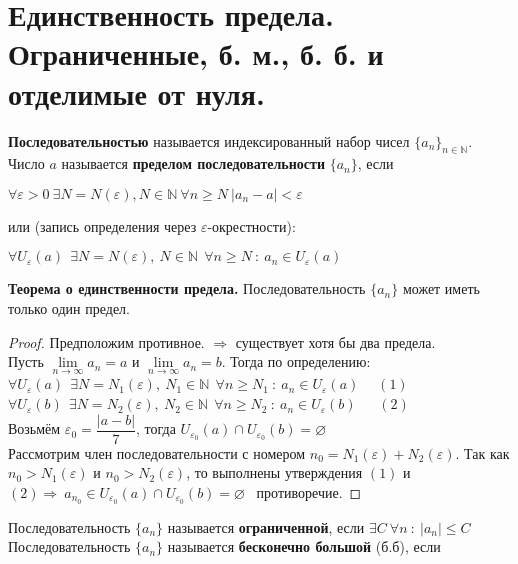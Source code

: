 \documentclass[12pt]{article}
\begin{document}
\section{Единственность предела. Ограниченные, б. м., б. б.  и отделимые от нуля.}
    \textbf{Последовательностью} называется индексированный набор чисел $\{a_n\}_{n \in \mathbb{N}}$. \\
    Число $a$ называется \textbf{пределом последовательности} $\{a_n\}$, если 
    \begin{center}
         $\forall \varepsilon  > 0 \ \exists N = N(\varepsilon), N \in \mathbb{N} \ \forall n \geq N \ |a_n - a| < \varepsilon$
    \end{center}
    или (запись определения через $\varepsilon$-окрестности): 
    \begin{center}
         $\forall U_\varepsilon(a) \ \ \exists N = N(\varepsilon), \ N \in \mathbb{N} \ \ \forall n \geq N \ : \  a_n \in  U_\varepsilon(a)$
    \end{center}
    \textbf{Теорема о единственности предела.} Последовательность $\{a_n\}$ может иметь только один предел.
    \begin{proof}
        Предположим противное. $\Rightarrow$ существует хотя бы два предела. \\ Пусть $\lim\limits_{n \to \infty} a_n = a$ и $\lim\limits_{n \to \infty} a_n = b$. Тогда по определению: \\
        $\forall U_\varepsilon(a) \ \ \exists N = N_1(\varepsilon), \ N_1 \in \mathbb{N} \ \ \forall n \geq N_1 \ : \  a_n \in  U_\varepsilon(a) \ \ $ \  $(1)$
        \\
        $\forall U_\varepsilon(b) \ \ \exists N = N_2(\varepsilon), \ N_2 \in \mathbb{N} \ \ \forall n \geq N_2 \ : \  a_n \in  U_\varepsilon(b)   \ $ \ \ $(2)$ \\
        Возьмём $\varepsilon_0 = \dfrac{|a-b|}{7}$, тогда $U_{\varepsilon_0}(a) \cap U_{\varepsilon_0}(b) = \varnothing$ \\
        Рассмотрим член последовательности с номером $n_0 = N_1(\varepsilon) + N_2(\varepsilon)$. Так как $n_0 > N_1(\varepsilon)$ и $n_0 > N_2(\varepsilon)$, то выполнены утверждения $(1)$ и $(2) \Rightarrow \ a_{n_0}  \in U_{\varepsilon_0}(a) \cap U_{\varepsilon_0}(b) = \varnothing$ \ противоречие.
    \end{proof}
    \noindent Последовательность $\{a_n\}$ называется \textbf{ограниченной}, если $ \exists C \ \forall n \ : \ |a_n| \leq C$ \\
    Последовательность $\{a_n\}$ называется \textbf{бесконечно большой} (б.б), если 
\end{document}
